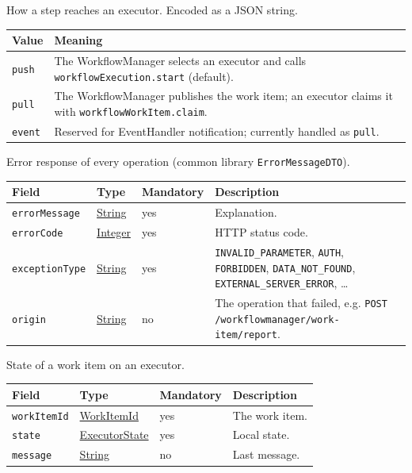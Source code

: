 \documentclass[a4paper]{arrowhead}
\newcommand{\mref}[1]{{\textcolor{ArrowheadPurple}{\hyperref[sec:model:#1]{#1}}}}
\newcommand{\pref}[1]{{\textcolor{ArrowheadGrey}{\hyperref[sec:model:primitives:#1]{#1}}}}
\begin{document}
How a step reaches an executor.
 Encoded as a JSON string.
{\small
\begin{longtable}{|p{3.9cm}|p{11.9cm}|}

\hline
\rowcolor{gray!33} Value & Meaning \\ \hline
\endhead
\texttt{push} & The WorkflowManager selects an executor and calls \texttt{workflowExecution.start} (default). \\ \hline
\texttt{pull} & The WorkflowManager publishes the work item; an executor claims it with \texttt{workflowWorkItem.claim}. \\ \hline
\texttt{event} & Reserved for EventHandler notification; currently handled as \texttt{pull}. \\ \hline
\end{longtable}
}

Error response of every operation (common library \texttt{ErrorMessageDTO}).

{\small
\begin{longtable}{|p{3.7cm}|p{4.2cm}|p{1.6cm}|p{6.3cm}|}

\hline
\rowcolor{gray!33} Field & Type & Mandatory & Description \\ \hline
\endhead
\texttt{errorMessage} & \pref{String} & yes & Explanation. \\ \hline
\texttt{errorCode} & \pref{Integer} & yes & HTTP status code. \\ \hline
\texttt{exceptionType} & \pref{String} & yes & \texttt{INVALID\_PARAMETER}, \texttt{AUTH}, \texttt{FORBIDDEN}, \texttt{DATA\_NOT\_FOUND}, \texttt{EXTERNAL\_SERVER\_ERROR}, \ldots \\ \hline
\texttt{origin} & \pref{String} & no & The operation that failed, e.g. \texttt{POST /workflowmanager/work-item/report}. \\ \hline
\end{longtable}
}

State of a work item on an executor.

{\small
\begin{longtable}{|p{3.7cm}|p{4.2cm}|p{1.6cm}|p{6.3cm}|}

\hline
\rowcolor{gray!33} Field & Type & Mandatory & Description \\ \hline
\endhead
\texttt{workItemId} & \pref{WorkItemId} & yes & The work item. \\ \hline
\texttt{state} & \mref{ExecutorState} & yes & Local state. \\ \hline
\texttt{message} & \pref{String} & no & Last message. \\ \hline
\end{longtable}
}
\end{document}
